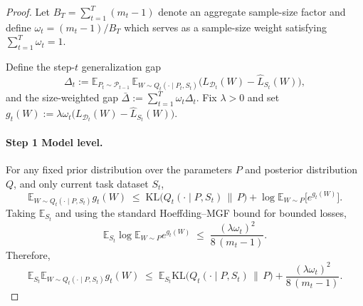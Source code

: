 \documentclass[10pt]{article} %
\begin{document}
\begin{proof}
    


Let $B_T=\sum_{t=1}^T (m_t-1)$ denote an aggregate sample-size factor and define $\omega_t=(m_t-1)/B_T$ which serves as a sample-size weight satisfying $\sum_{t=1}^T\omega_t=1$.



Define the step-$t$ generalization gap
\[
\Delta_t
:=\mathbb E_{P_t\sim\mathcal P_{t-1}}\,
\mathbb E_{W\sim Q_t(\cdot\mid P_t,S_t)}
\big(L_{\mathcal D_t}(W)-\hat L_{S_t}(W)\big),
\]
and the size-weighted gap $\bar\Delta:=\sum_{t=1}^T \omega_t \Delta_t$.
Fix $\lambda>0$ and set
\(
g_t(W):=\lambda\omega_t\big(L_{\mathcal D_t}(W)-\hat L_{S_t}(W)\big).
\)

\paragraph{Step 1 Model level.}
For any fixed prior distribution over the parameters $P$ and posterior distribution $Q$, and only current task dataset $S_t$,   
\begin{equation}
\label{eq:dv-w}
\mathbb E_{W\sim Q_t(\cdot\mid P,S_t)} g_t(W)
\;\le\;
\mathrm{KL}\!\big(Q_t(\cdot\mid P,S_t)\,\|\,P\big)
+\log\mathbb E_{W\sim P}\!\big[e^{g_t(W)}\big].
\end{equation}
Taking $\mathbb E_{S_t}$ and using the standard Hoeffding--MGF bound for bounded losses,
\begin{equation}
\label{eq:mgf-mean-gap}
\mathbb E_{S_t}\log\mathbb E_{W\sim P} e^{g_t(W)}
\;\le\; \frac{(\lambda\omega_t)^2}{8\,(m_t-1)}.
\end{equation}
Therefore,
\begin{equation}
\label{eq:model-step}
\mathbb E_{S_t}\mathbb E_{W\sim Q_t(\cdot\mid P,S_t)} g_t(W)
\;\le\;
\mathbb E_{S_t}\mathrm{KL}\!\big(Q_t(\cdot\mid P,S_t)\,\|\,P\big)
+\frac{(\lambda\omega_t)^2}{8\,(m_t-1)}.
\end{equation}

\end{proof}
\end{document}
